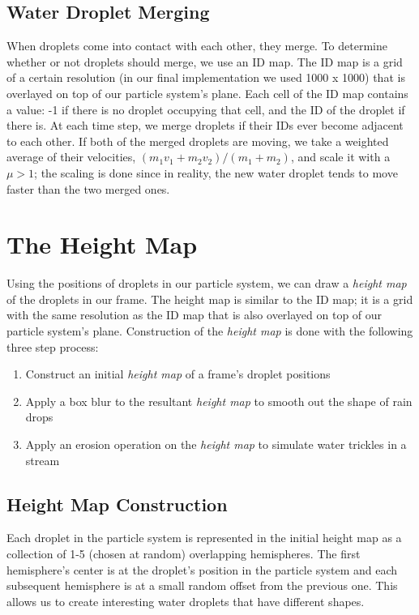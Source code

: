 \documentclass[10pt,twocolumn,letterpaper]{article}
\begin{document}
\subsection{Water Droplet Merging}

When droplets come into contact with each other, they merge. To determine whether or not droplets should merge, we use an ID map. The ID map is a grid of a certain resolution (in our final implementation we used 1000 x 1000) that is overlayed on top of our particle system's plane. Each cell of the ID map contains a value: -1 if there is no droplet occupying that cell, and the ID of the droplet if there is. At each time step, we merge droplets if their IDs ever become adjacent to each other. If both of the merged droplets are moving, we take a weighted average of their velocities, $(m_{1}v_{1} + m_{2}v_{2})/(m_{1} + m_{2})$, and scale it with a $\mu > 1$; the scaling is done since in reality, the new water droplet tends to move faster than the two merged ones.

\section{The Height Map}

Using the positions of droplets in our particle system, we can draw a \emph{height map} of the droplets in our frame. The height map is similar to the ID map; it is a grid with the same resolution as the ID map that is also overlayed on top of our particle system's plane. Construction of the \emph{height map} is done with the following three step process:

\begin{enumerate}
    \item Construct an initial \emph{height map} of a frame's droplet positions
    \item Apply a box blur to the resultant \emph{height map} to smooth out the shape of rain drops
    \item Apply an erosion operation on the \emph{height map} to simulate water trickles in a stream
\end{enumerate}

\subsection{Height Map Construction}

Each droplet in the particle system is represented in the initial height map as a collection of 1-5 (chosen at random) overlapping hemispheres. The first hemisphere's center is at the droplet's position in the particle system and each subsequent hemisphere is at a small random offset from the previous one. This allows us to create interesting water droplets that have different shapes.
\end{document}
